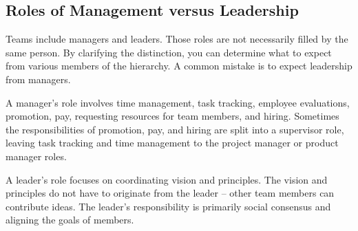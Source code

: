

\subsection*{Roles of Management versus Leadership}

Teams include managers and leaders. Those roles are not necessarily filled by the same person. By clarifying the distinction, you can determine what to expect from various members of the hierarchy. A common mistake is to expect leadership from managers. 

A manager's role involves time management, task tracking, employee evaluations, promotion, pay, requesting resources for team members, and hiring. Sometimes the responsibilities of promotion, pay, and hiring are split into a supervisor role, leaving task tracking and time management to the project manager or product manager roles.

A leader's role focuses on coordinating vision and principles. The vision and principles do not have to originate from the leader -- other team members can contribute ideas. The leader's responsibility is primarily social consensus and aligning the goals of members. 
